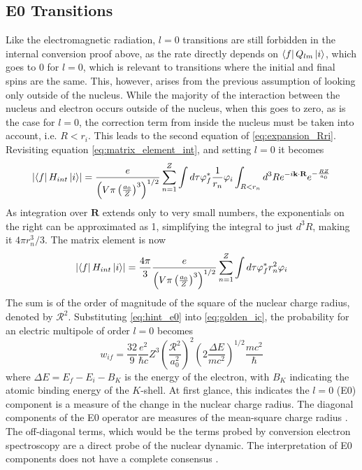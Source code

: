 \subsection{E0 Transitions}
\label{sec:E0}

Like the electromagnetic radiation, $l=0$ transitions are still forbidden in the internal conversion proof above, as the rate directly depends on $\bra{f}Q_{lm}\ket{i}$, which goes to 0 for $l=0$, which is relevant to transitions where the initial and final spins are the same. This, however, arises from the previous assumption of looking only outside of the nucleus. While the majority of the interaction between the nucleus and electron occurs outside of the nucleus, when this goes to zero, as is the case for $l=0$, the correction term from inside the nucleus must be taken into account, i.e. $R<r_i$. This leads to the second equation of \ref{eq:expansion_Rri}. Revisiting equation \ref{eq:matrix_element_int}, and setting $l=0$ it becomes
\begin{equation}
\label{eq:matrix_element_E0}
    \abs{\bra{f}H_{int}\ket{i}} = \frac{e}{\left(V\pi\left(\frac{a_0}{Z}\right)^3\right)^{1/2}}\sum_{n=1}^Z \int d\tau\varphi_{f}^*\frac{1}{r_n}\varphi_{i} \int_{R<r_n}d^3R e^{-i\textbf{k}\cdot\textbf{R}} e^{-\frac{RZ}{a_0}}
\end{equation}
As integration over $\textbf{R}$ extends only to very small numbers, the exponentials on the right can be approximated as 1, simplifying the integral to just $d^3R$, making it $4\pi r_n^3/3$. The matrix element is now
\begin{equation}
\label{eq:hint_e0}
    \abs{\bra{f}H_{int}\ket{i}} =  \frac{4\pi}{3}\frac{e}{\left(V\pi\left(\frac{a_0}{Z}\right)^3\right)^{1/2}} \sum_{n=1}^Z \int d\tau\varphi_{f}^*r_n^2\varphi_{i}
\end{equation}
The sum is of the order of magnitude of the square of the nuclear charge radius, denoted by $\mathcal{R}^2$. Substituting \ref{eq:hint_e0} into \ref{eq:golden_ic}, the probability for an electric multipole of order $l=0$ becomes
\begin{equation}
    w_{if} = \frac{32}{9}\frac{e^2}{\hbar c}Z^3\left(\frac{\mathcal{R}^2}{a_0^2}\right)^2\left(2\frac{\Delta E}{mc^2}\right)^{1/2}\frac{mc^2}{\hbar}
\end{equation}
where $\Delta E=E_f-E_i-B_K$ is the energy of the electron, with $B_K$ indicating the atomic binding energy of the $K$-shell. At first glance, this indicates the $l=0$ (E0) component is a measure of the change in the nuclear charge radius. The diagonal components of the E0 operator are measures of the mean-square charge radius \citep{wood99:_e0}. The off-diagonal terms, which would be the terms probed by conversion electron spectroscopy are a direct probe of the nuclear dynamic. The interpretation of E0 components does not have a complete consensus \citep{ilie11:_deformed}.

